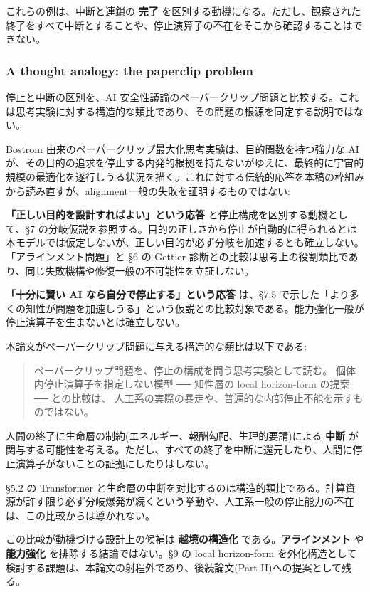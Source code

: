 これらの例は、中断と連鎖の \textbf{完了} を区別する動機になる。ただし、観察された終了をすべて中断とすることや、停止演算子の不在をそこから確認することはできない。

\subsubsection{A thought analogy: the paperclip problem}


停止と中断の区別を、AI 安全性議論のペーパークリップ問題と比較する。これは思考実験に対する構造的な類比であり、その問題の根源を同定する説明ではない。

Bostrom 由来のペーパークリップ最大化思考実験は、目的関数を持つ強力な AI が、その目的の追求を停止する内発的根拠を持たないがゆえに、最終的に宇宙的規模の最適化を遂行しうる状況を描く。これに対する伝統的応答を本稿の枠組みから読み直すが、alignment一般の失敗を証明するものではない:

\textbf{「正しい目的を設計すればよい」という応答} と停止構成を区別する動機として、\S{}7 の分岐仮説を参照する。目的の正しさから停止が自動的に得られるとは本モデルでは仮定しないが、正しい目的が必ず分岐を加速するとも確立しない。「アラインメント問題」と \S{}6 の Gettier 診断との比較は思考上の役割類比であり、同じ失敗機構や修復一般の不可能性を立証しない。

\textbf{「十分に賢い AI なら自分で停止する」という応答} は、\S{}7.5 で示した「より多くの知性が問題を加速しうる」という仮説との比較対象である。能力強化一般が停止演算子を生まないとは確立しない。

本論文がペーパークリップ問題に与える構造的な類比は以下である:

\begin{quote}
ペーパークリップ問題を、停止の構成を問う思考実験として読む。
個体内停止演算子を指定しない模型 ── 知性層の local horizon-form の提案 ── との比較は、
人工系の実際の暴走や、普遍的な内部停止不能を示すものではない。
\end{quote}

人間の終了に生命層の制約(エネルギー、報酬勾配、生理的要請)による \textbf{中断} が関与する可能性を考える。ただし、すべての終了を中断に還元したり、人間に停止演算子がないことの証拠にしたりはしない。

\S{}5.2 の Transformer と生命層の中断を対比するのは構造的類比である。計算資源が許す限り必ず分岐爆発が続くという挙動や、人工系一般の停止能力の不在は、この比較からは導かれない。

この比較が動機づける設計上の候補は \textbf{越境の構造化} である。\textbf{アラインメント} や \textbf{能力強化} を排除する結論ではない。\S{}9 の local horizon-form を外化構造として検討する課題は、本論文の射程外であり、後続論文(Part II)への提案として残る。

